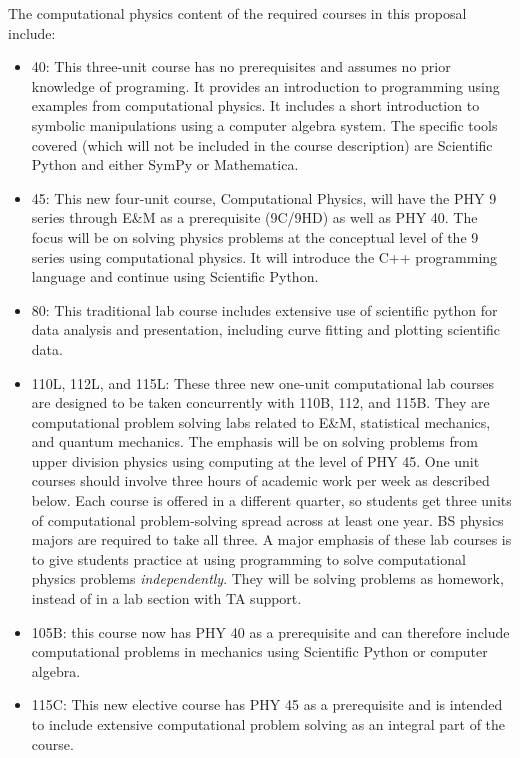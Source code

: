 \documentclass[12pt]{article}
\begin{document}
The computational physics content of the required courses in this
proposal include:
\begin{itemize}
\item 40: This three-unit course has no prerequisites and assumes no
  prior knowledge of programing.  It provides an introduction to
  programming using examples from computational physics.  It includes
  a short introduction to symbolic manipulations using a computer
  algebra system.  The specific tools covered (which will not be
  included in the course description) are Scientific Python and either
  SymPy or Mathematica.

\item 45: This new four-unit course, Computational Physics, will have
  the PHY 9 series through E\&M as a prerequisite (9C/9HD) as well as
  PHY 40.  The focus will be on solving physics problems at the
  conceptual level of the 9 series using computational physics.  It
  will introduce the C++ programming language and continue using
  Scientific Python.
  
\item 80: This traditional lab course includes extensive use of
  scientific python for data analysis and presentation, including
  curve fitting and plotting scientific data.
  
\item 110L, 112L, and 115L: These three new one-unit computational lab
  courses are designed to be taken concurrently with 110B, 112, and
  115B. They are computational problem solving labs related to E\&M,
  statistical mechanics, and quantum mechanics.  The emphasis will be
  on solving problems from upper division physics using computing at
  the level of PHY 45.  One unit courses should involve three hours of
  academic work per week as described below.  Each course is offered
  in a different quarter, so students get three units of computational
  problem-solving spread across at least one year.  BS physics majors
  are required to take all three.  A major emphasis of these lab
  courses is to give students practice at using programming to solve
  computational physics problems {\em independently}. They will be
  solving problems as homework, instead of in a lab section with TA
  support.
  
\item 105B: this course now has PHY 40 as a prerequisite and can
  therefore include computational problems in mechanics using
  Scientific Python or computer algebra.

\item 115C: This new elective course has PHY 45 as a prerequisite and
  is intended to include extensive computational problem solving as an
  integral part of the course.
  
\end{itemize}
\end{document}
